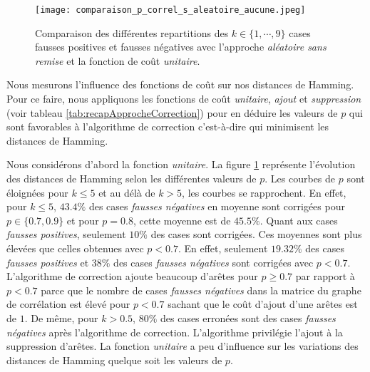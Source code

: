 \begin{figure}[htb!] 
\centering
\texttt{[image: comparaison\_p\_correl\_s\_aleatoire\_aucune.jpeg]}
\caption{ Comparaison des diff\'erentes repartitions des $k \in \{1,\cdots,9\}$ cases fausses positives et fausses n\'egatives avec l'approche {\em al\'eatoire sans remise} et la fonction de co\^ut {\em unitaire}. }
\label{comparaison_p_correl_s_aleatoire_aucune} 
\end{figure}


Nous mesurons l'influence des fonctions de co\^ut sur nos distances de Hamming.
Pour ce faire, nous appliquons les fonctions de co\^ut {\em unitaire}, {\em ajout} et {\em suppression} (voir tableau \ref{tab:recapApprocheCorrection}) pour en d\'eduire les valeurs de $p$ qui sont favorables \`a l'algorithme de correction c'est-\`a-dire qui minimisent les distances de Hamming.
\newline

Nous consid\'erons d'abord la fonction {\em unitaire}.
La figure \ref{comparaison_p_correl_s_aleatoire_aucune} repr\'esente l'\'evolution des distances de Hamming selon les diff\'erentes valeurs de $p$.  Les courbes de $p$ sont \'eloign\'ees pour $k \le 5$ et au d\'el\`a de  $k > 5$, les courbes se rapprochent. 
En effet, 
pour $k \le 5$, $43.4\%$ des cases {\em fausses n\'egatives} en moyenne sont corrig\'ees pour $p\in \{0.7, 0.9\}$ et pour $p=0.8$, cette moyenne est de $45.5\%$. Quant aux cases {\em fausses positives}, seulement $10\%$ des cases sont corrig\'ees. 
Ces moyennes sont plus \'elev\'ees que celles obtenues avec $p<0.7$.  
En effet, seulement $19.32\%$ des cases {\em fausses positives} et $38\%$ des cases  {\em fausses n\'egatives} sont corrig\'ees avec  $p<0.7$. 
 L'algorithme de correction ajoute beaucoup d'ar\^etes pour $p \ge 0.7$ par rapport \`a $p<0.7$ parce que le nombre de cases {\em fausses n\'egatives} dans la matrice du graphe de corr\'elation est \'elev\'e pour $p<0.7$ sachant que le co\^ut d'ajout  d'une ar\^etes est de $1$.
\newline
De m\^eme, pour $k > 0.5$, $80\%$ des cases erron\'ees sont des cases {\em fausses n\'egatives} apr\`es l'algorithme de correction.  L'algorithme privil\'egie l'ajout  \`a la suppression d'ar\^etes. 
\newline
La fonction {\em unitaire} a peu d'influence sur les variations des distances de Hamming quelque soit les valeurs de $p$.  

